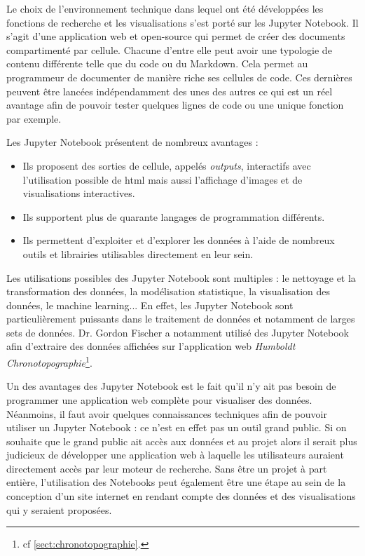 \documentclass[a4paper, 12pt, twoside]{book}
\begin{document}
Le choix de l'environnement technique dans lequel ont été développées les fonctions de recherche et les visualisations s'est porté sur les Jupyter Notebook. Il s'agit d'une application web et open-source qui permet de créer des documents compartimenté par cellule. Chacune d'entre elle peut avoir une typologie de contenu différente telle que du code ou du Markdown. Cela permet au programmeur de documenter de manière riche ses cellules de code. Ces dernières peuvent être lancées indépendamment des unes des autres ce qui est un réel avantage afin de pouvoir tester quelques lignes de code ou une unique fonction par exemple. 

Les Jupyter Notebook présentent de nombreux avantages : 
\begin{itemize}
    \item Ils proposent des sorties de cellule, appelés \textit{outputs}, interactifs avec l'utilisation possible de \gls{html} mais aussi l'affichage d'images et de visualisations interactives.
    \item Ils supportent plus de quarante langages de programmation différents.
    \item Ils permettent d'exploiter et d'explorer les données à l'aide de nombreux outils et librairies utilisables directement en leur sein. 
\end{itemize}

Les utilisations possibles des Jupyter Notebook sont multiples : le nettoyage et la transformation des données, la modélisation statistique, la visualisation des données, le machine learning... En effet, les Jupyter Notebook sont particulièrement puissants dans le traitement de données et notamment de larges sets de données. Dr. Gordon Fischer a notamment utilisé des Jupyter Notebook afin d'extraire des données affichées sur l'application web \textit{Humboldt Chronotopographie}\footnote{cf \autoref{sect:chronotopographie}.}.

Un des avantages des Jupyter Notebook est le fait qu'il n'y ait pas besoin de programmer une application web complète pour visualiser des données. Néanmoins, il faut avoir quelques connaissances techniques afin de pouvoir utiliser un Jupyter Notebook : ce n'est en effet pas un outil grand public. Si on souhaite que le grand public ait accès aux données et au projet alors il serait plus judicieux de développer une application web à laquelle les utilisateurs auraient directement accès par leur moteur de recherche. Sans être un projet à part entière, l'utilisation des Notebooks peut également être une étape au sein de la conception d'un site internet en rendant compte des données et des visualisations qui y seraient proposées.
\end{document}
